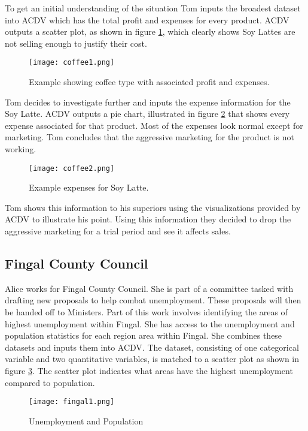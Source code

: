 \documentclass[a4paper, 11pt, titlepage, onehalfspacing]{report}
\begin{document}
To get an initial understanding of the situation Tom inputs the broadest dataset into AC\lightning{}DV which has the total profit and expenses for every product. AC\lightning{}DV outputs a scatter plot, as shown in figure \ref{coffee1}, which clearly shows Soy Lattes are not selling enough to justify their cost. 

\begin{figure}[htp] \centering
\texttt{[image: coffee1.png]}
\caption{Example showing coffee type with associated profit and expenses.}
\label{coffee1}
\end{figure}

Tom decides to investigate further and inputs the expense information for the Soy Latte. AC\lightning{}DV outputs a pie chart, illustrated in figure \ref{coffeepie} that shows every expense associated for that product. Most of the expenses look normal except for marketing. Tom concludes that the aggressive marketing for the product is not working. 

\begin{figure}[htp] \centering
\texttt{[image: coffee2.png]}
\caption{Example expenses for Soy Latte.}
\label{coffeepie}
\end{figure}

Tom shows this information to his superiors using the visualizations provided by AC\lightning{}DV to illustrate his point. Using this information they decided to drop the aggressive marketing for a trial period and see it affects sales.
\subsection{Fingal County Council}

Alice works for Fingal County Council. She is part of a committee tasked with drafting new proposals to help combat unemployment. These proposals will then be handed off to Ministers. Part of this work involves identifying the areas of highest unemployment within Fingal. She has access to the unemployment and population statistics for each region area within Fingal. She combines these datasets and inputs them into AC\lightning{}DV. The dataset, consisting of one categorical variable and two quantitative variables, is matched to a scatter plot as shown in figure \ref{fingal1}. The scatter plot indicates what areas have the highest unemployment compared to population. 

\begin{figure}[htp] \centering
\texttt{[image: fingal1.png]}
\caption{Unemployment and Population}
\label{fingal1}
\end{figure}
\end{document}

